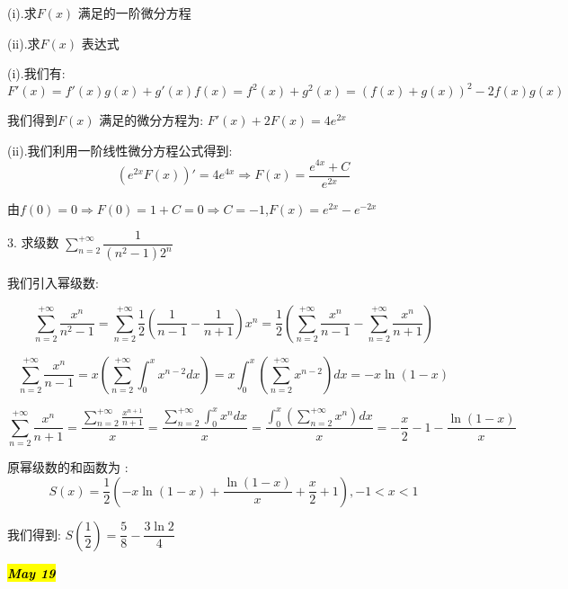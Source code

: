 (i).求$F(x)$ 满足的一阶微分方程

(ii).求$F(x)$ 表达式
\begin{solution}
	
	(i).我们有: 
	$$F'(x)=f'(x)g(x)+g'(x)f(x)=f^2(x)+g^2(x)=(f(x)+g(x))^2-2f(x)g(x)$$
	
	我们得到$F(x)$ 满足的微分方程为: $F'(x)+2F(x)=4e^{2x}$
	
	(ii).我们利用一阶线性微分方程公式得到: 
	$$(e^{2x}F(x))'=4e^{4x}\Rightarrow F(x)=\frac{e^{4x}+C}{e^{2x}}$$
	
	由$f(0)=0\Rightarrow F(0)=1+C=0\Rightarrow C=-1$,$F(x)=e^{2x}-e^{-2x}$
\end{solution}


3. 求级数 $\sum\limits_{n=2}^{+\infty}\dfrac{1}{(n^2-1)2^n}$
\begin{solution}
	
	我们引入幂级数: 
	
	$$\sum\limits_{n=2}^{+\infty}\frac{x^n}{n^2-1}=\sum\limits_{n=2}^{+\infty}\frac{1}{2}(\frac{1}{n-1}-\frac{1}{n+1})x^n=\frac{1}{2}(\sum\limits_{n=2}^{+\infty}\frac{x^n}{n-1}-\sum\limits_{n=2}^{+\infty}\frac{x^n}{n+1})$$
	
	$$\sum\limits_{n=2}^{+\infty}\frac{x^n}{n-1}=x(\sum\limits_{n=2}^{+\infty}\int_{0}^{x}x^{n-2}dx)=x\int_{0}^{x}(\sum\limits_{n=2}^{+\infty}x^{n-2})dx=-x\ln(1-x)$$
	
	$$\sum\limits_{n=2}^{+\infty}\frac{x^n}{n+1}=\frac{\sum\limits_{n=2}^{+\infty}\frac{x^{n+1}}{n+1}}{x}=\frac{\sum\limits_{n=2}^{+\infty}\int_{0}^{x}x^ndx}{x}=\frac{\int_{0}^{x}(\sum\limits_{n=2}^{+\infty}x^n)dx}{x}=-\frac{x}{2}-1-\frac{\ln(1-x)}{x}$$
	
	原幂级数的和函数为 : 
	$$S(x)=\frac{1}{2}(-x\ln(1-x)+\frac{\ln(1-x)}{x}+\frac{x}{2}+1),-1<x<1$$
	
	我们得到: $S(\dfrac{1}{2})=\dfrac{5}{8}-\dfrac{3\ln 2}{4}$
\end{solution}


\hl{\textbf{\textit{May 19}}}


